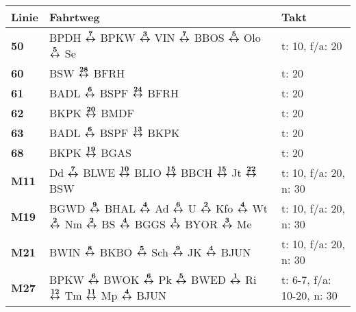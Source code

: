 \begin{minipage}[t]{0.45\textwidth}
\begin{tabular}{>{\bfseries}L{1.2cm}L{9.0cm}L{3.0cm}}
{\bfseries Linie} & {\bfseries Fahrtweg} & {\bfseries Takt} \\
\hline
\tram{} 50    & BPDH $\xarwe{7}$ BPKW $\xarwe{3}$ VIN $\xarwe{7}$ BBOS $\xarwe{5}$ Olo $\xarwe{5}$ Se                                                                               & t: 10, f/a: 20             \\
\tram{} 60    & BSW $\xarwe{28}$ BFRH                                                                                                                                               & t: 20                      \\
\tram{} 61    & BADL $\xarwe{6}$ BSPF $\xarwe{24}$ BFRH                                                                                                                             & t: 20                      \\
\tram{} 62    & BKPK $\xarwe{20}$ BMDF                                                                                                                                              & t: 20                      \\
\tram{} 63    & BADL $\xarwe{6}$ BSPF $\xarwe{13}$ BKPK                                                                                                                             & t: 20                      \\
\tram{} 68    & BKPK $\xarwe{19}$ BGAS                                                                                                                                              & t: 20                      \\
\mbus{} M11   & Dd $\xarwe{7}$ BLWE $\xarwe{10}$ BLIO $\xarwe{15}$ BBCH $\xarwe{15}$ Jt $\xarwe{22}$ BSW                                                                            & t: 10, f/a: 20, n: 30      \\
\mbus{} M19   & BGWD $\xarwe{9}$ BHAL $\xarwe{4}$ Ad $\xarwe{6}$ U $\xarwe{2}$ Kfo $\xarwe{4}$ Wt $\xarwe{2}$ Nm $\xarwe{2}$ BS $\xarwe{4}$ BGGS $\xarwe{1}$ BYOR $\xarwe{3}$ Me    & t: 10, f/a: 20, n: 30      \\
\mbus{} M21   & BWIN $\xarwe{8}$ BKBO $\xarwe{5}$ Sch $\xarwe{9}$ JK $\xarwe{4}$ BJUN                                                                                               & t: 10, f/a: 20, n: 30      \\
\mbus{} M27   & BPKW $\xarwe{6}$ BWOK $\xarwe{6}$ Pk $\xarwe{5}$ BWED $\xarwe{1}$ Ri $\xarwe{12}$ Tm $\xarwe{11}$ Mp $\xarwe{4}$ BJUN                                               & t: 6-7, f/a: 10-20, n: 30  \\

\end{tabular}
\end{minipage}
